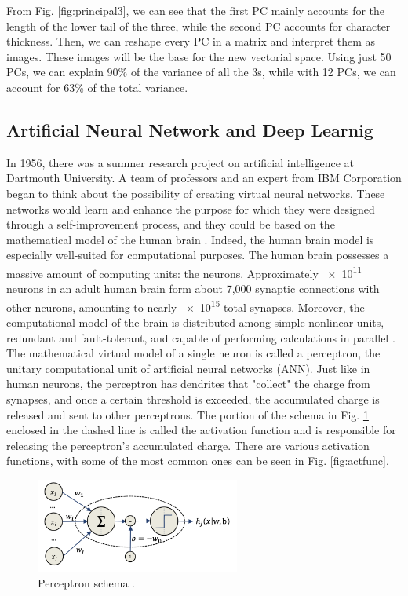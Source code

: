 From Fig. \ref{fig:principal3}, we can see that the first PC mainly accounts for the length of the lower tail of the three, while the second PC accounts for character thickness. Then, we can reshape every PC in a matrix and interpret them as images. These images will be the base for the new vectorial space. Using just 50 PCs, we can explain 90\% of the variance of all the 3s, while with 12 PCs, we can account for 63\% of the total variance.



\subsection{Artificial Neural Network and Deep Learnig}
\label{subsec:deepl}
In 1956, there was a summer research project on artificial intelligence at Dartmouth University. A team of professors and an expert from IBM Corporation began to think about the possibility of creating virtual neural networks. These networks would learn and enhance the purpose for which they were designed through a self-improvement process, and they could be based on the mathematical model of the human brain \cite{mccarthy_proposal_1955}. Indeed, the human brain model is especially well-suited for computational purposes. The human brain possesses a massive amount of computing units: the neurons. Approximately \num{e11} neurons in an adult human brain form about 7,000 synaptic connections with other neurons, amounting to nearly \num{e15} total synapses. Moreover, the computational model of the brain is distributed among simple nonlinear units, redundant and fault-tolerant, and capable of performing calculations in parallel \cite{matteo_matteucci_perceptrons_2021}. The mathematical virtual model of a single neuron is called a perceptron, the unitary computational unit of artificial neural networks (ANN). Just like in human neurons, the perceptron has dendrites that "collect" the charge from synapses, and once a certain threshold is exceeded, the accumulated charge is released and sent to other perceptrons. The portion of the schema in Fig. \ref{fig:perceptron} enclosed in the dashed line is called the activation function and is responsible for releasing the perceptron's accumulated charge. There are various activation functions, with some of the most common ones can be seen in Fig. \ref{fig:actfunc}.
\begin{figure}
    \centering
    \includegraphics[width=0.6\textwidth]{Images/neurone.png}
    \caption[Perceptron schema]{Perceptron schema \cite{matteo_matteucci_perceptrons_2021}.}
    \label{fig:perceptron}
\end{figure}
